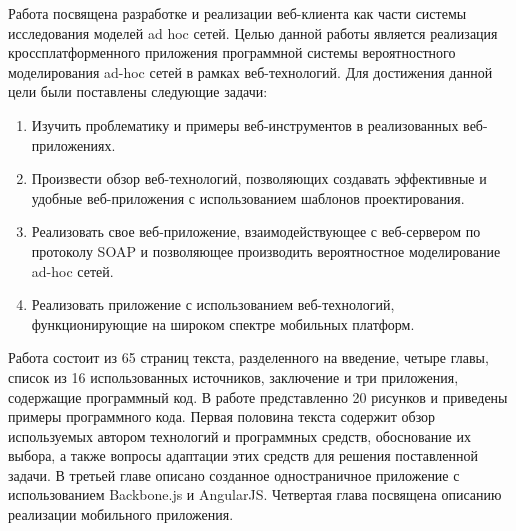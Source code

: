 


Работа посвящена разработке и реализации веб-клиента как части системы исследования моделей ad hoc сетей. 
Целью данной работы является реализация кроссплатформенного приложения программной системы вероятностного моделирования ad-hoc сетей в рамках веб-технологий. Для достижения данной цели были поставлены следующие задачи:

\begin{enumerate}

\item Изучить проблематику и примеры веб-инструментов в реализованных
 веб-приложениях.

\item Произвести обзор веб-технологий, позволяющих создавать эффективные и удобные веб-приложения с использованием шаблонов проектирования.

\item Реализовать свое веб-приложение, взаимодействующее с веб-сервером
 по протоколу SOAP и позволяющее производить вероятностное моделирование ad-hoc сетей.

\item Реализовать приложение с использованием веб-технологий, функционирующие на широком спектре мобильных платформ.

\end{enumerate}

Работа состоит из 65 страниц текста, разделенного на введение, четыре главы, список из 16 использованных источников, заключение и три приложения, содержащие программный код. В работе представленно 20 рисунков и приведены примеры программного кода. Первая половина текста содержит обзор используемых автором технологий и программных средств, обоснование их выбора, а также вопросы адаптации этих средств для решения поставленной задачи. В третьей главе описано созданное одностраничное приложение с использованием Backbone.js и AngularJS. Четвертая глава посвящена описанию реализации мобильного приложения.


